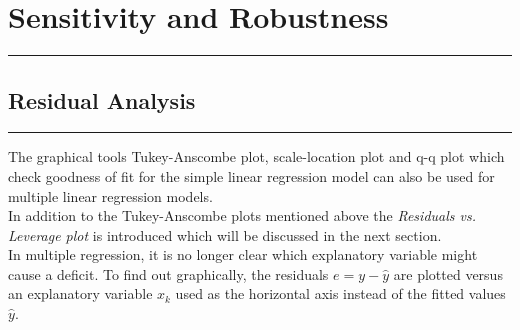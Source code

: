 \section{Sensitivity and Robustness}
\noindent\rule[\linienAbstand]{\linewidth}{\linienDickeDick}

\subsection{Residual Analysis}
\noindent\rule[\linienAbstand]{\linewidth}{\linienDicke}
The graphical tools Tukey-Anscombe plot, scale-location plot and q-q plot which check goodness of fit for the simple linear regression model can also be used for multiple linear regression models.\\
In addition to the Tukey-Anscombe plots mentioned above the \emph{Residuals vs. Leverage plot} is introduced which will be discussed in the next section.\\

In multiple regression, it is no longer clear which explanatory variable might cause a deficit. To find out graphically, the residuals $e = y - \hat{y}$ are plotted versus an explanatory variable $x_k$ used as the horizontal axis instead of the fitted values $\hat{y}$.\\

